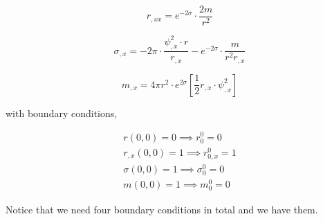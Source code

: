 \begin{equation}
    r_{, x x}=e^{-2 \sigma} \cdot \frac{2 m}{r^{2}}
\end{equation}\label{eqn:r_chap3}


\begin{equation}
    \sigma_{, x}= -2 \pi \cdot  \frac{\psi_{, x}^{2} \cdot r}{r_{,x}}- e^{-2 \sigma} \cdot \frac{ m}{r^{2}r_{, x}}
\end{equation}\label{eqn:sigma_chap3}

\begin{equation}m_{, x}=4 \pi r^{2} \cdot e^{2 \sigma}\left[\frac{1}{2} r_{, x} \cdot \psi_{, x}^{2} \right]\end{equation}


with boundary conditions,

\begin{eqnarray}
    r(0 ,0) = 0 \implies r^0_0 = 0 \\
    r_{,x}(0 ,0) = 1 \implies r^0_{0,x} = 1 \\
    \sigma(0 ,0) = 1 \implies \sigma^0_0 = 0 \\
    m(0 ,0) = 1 \implies m^0_0 = 0
\end{eqnarray}

Notice that we need four boundary conditions in total and we have them.
